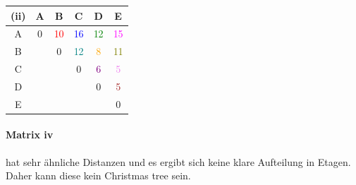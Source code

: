 \begin{tabular}{c|ccccc}
(ii) & A & B & C & D & E \\
\hline
A & 0 & \textcolor{red}{10} & \textcolor{blue}{16} & \textcolor{green}{12} & \textcolor{magenta}{15} \\
B &   & 0 & \textcolor{teal}{12} & \textcolor{orange}{8} & \textcolor{olive}{11} \\
C &   &   & 0 & \textcolor{purple}{6} & \textcolor{violet}{5} \\
D &   &   &   & 0 & \textcolor{brown}{5} \\
E &   &   &   &   & 0 \\
\end{tabular}

\paragraph{Matrix iv} hat sehr ähnliche Distanzen und es ergibt sich keine klare Aufteilung in Etagen. Daher kann diese kein Christmas tree sein. 